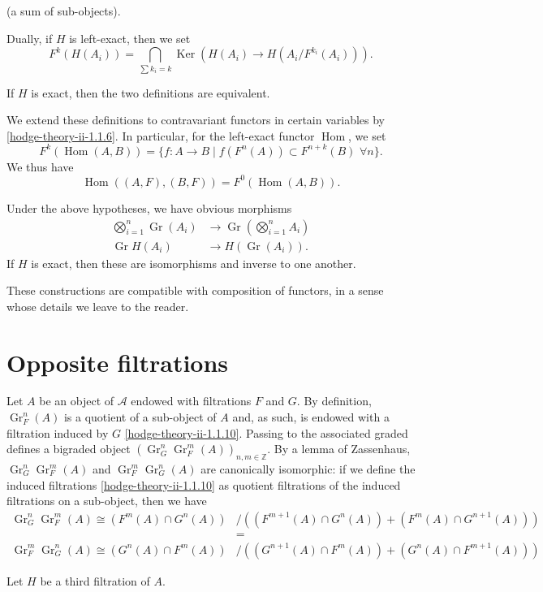     (a sum of sub-objects).\par{}Dually, if \(H\) is left-exact, then we set
    \[       F^k(H(A_i))       = \bigcap _{\sum  k_i=k} \operatorname {Ker}(H(A_i)\to  H(A_i/F^{k_i}(A_i))).     \]\par{}If \(H\) is exact, then the two definitions are equivalent.\par{}We extend these definitions to contravariant functors in certain variables by \cref{hodge-theory-ii-1.1.6}.
    In particular, for the left-exact functor \(\operatorname {Hom}\), we set
    \[       F^k(\operatorname {Hom}(A,B))       = \{f\colon  A\to  B \mid  f(F^n(A))\subset  F^{n+k}(B)\,\,\forall  n\}.     \]
    We thus have
    \[       \operatorname {Hom}((A,F),(B,F))       = F^0(\operatorname {Hom}(A,B)).     \]

    Under the above hypotheses, we have obvious morphisms
    \[       \begin {aligned}         \bigotimes _{i=1}^n \operatorname {Gr}(A_i)         &\to  \operatorname {Gr}(\bigotimes _{i=1}^n A_i)       \\\operatorname {Gr} H(A_i)         &\to  H(\operatorname {Gr}(A_i)).       \end {aligned}     \]
    If \(H\) is exact, then these are isomorphisms and inverse to one another.\par{}These constructions are compatible with composition of functors, in a sense whose details we leave to the reader.\section{Opposite filtrations}\label{hodge-theory-ii-1.2}\label{hodge-theory-ii-1.2.1}\par{}Let \(A\) be an object of \(\mathscr {A}\) endowed with filtrations \(F\) and \(G\).
    By definition, \(\operatorname {Gr}_F^n(A)\) is a quotient of a sub-object of \(A\) and, as such, is endowed with a filtration induced by \(G\) \cref{hodge-theory-ii-1.1.10}.
    Passing to the associated graded defines a bigraded object \((\operatorname {Gr}_G^n\operatorname {Gr}_F^m(A))_{n,m\in \mathbb {Z}}\).
    By a lemma of Zassenhaus, \(\operatorname {Gr}_G^n\operatorname {Gr}_F^m(A)\) and \(\operatorname {Gr}_F^m\operatorname {Gr}_G^n(A)\) are canonically isomorphic: if we define the induced filtrations \cref{hodge-theory-ii-1.1.10} as quotient filtrations of the induced filtrations on a sub-object, then we have
    \[       \begin {aligned}         \operatorname {Gr}_G^n\operatorname {Gr}_F^m(A)         \cong  (F^m(A)\cap  G^n(A)) &/ ((F^{m+1}(A)\cap  G^n(A)) + (F^m(A)\cap  G^{n+1}(A)))       \\&=       \\\operatorname {Gr}_F^m\operatorname {Gr}_G^n(A)         \cong  (G^n(A)\cap  F^m(A)) &/ ((G^{n+1}(A)\cap  F^m(A)) + (G^n(A)\cap  F^{m+1}(A)))       \end {aligned}     \]\label{hodge-theory-ii-1.2.2}\par{}Let \(H\) be a third filtration of \(A\).
